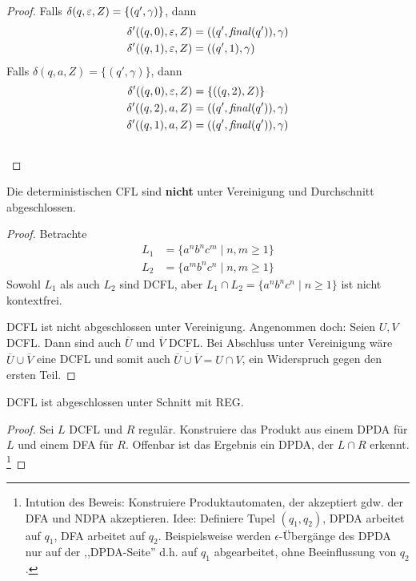 {\begin{proof}
  Falls $\delta(q,\varepsilon,Z) = \{(q',\gamma)\}$, dann
  \begin{align*}
    \delta'((q,0),\varepsilon,Z) &= ((q',\mathit{final} (q')),\gamma)
    \\
    \delta'((q,1),\varepsilon,Z) &= ((q',1),\gamma)
  \end{align*}
  Falls $\delta(q,a,Z) = \{(q',\gamma)\}$, dann
  \begin{align*}
    \delta'((q,0), \Eps, Z) &= \{ ((q,2), Z) \} \\
    \delta'((q,2), a, Z) &=((q',\mathit{final} (q')), \gamma)
    \\
    \delta'((q,1), a, Z) &=
    ((q',\mathit{final} (q')), \gamma)
    \\ \tag*{\qedhere}    %
  \end{align*}
\end{proof}
\begin{Satz}
    Die deterministischen \ac{CFL} sind \textbf{nicht} unter Vereinigung und Durchschnitt abgeschlossen.
\end{Satz}
\begin{proof}
    Betrachte
    \begin{align*}
        L_1 &= \{ a^nb^nc^m \mid n, m \ge 1 \} \\
        L_2 &= \{ a^mb^nc^n \mid n, m \ge 1 \}
    \end{align*}
    Sowohl $L_1$ als auch $L_2$ sind DCFL, aber $L_1 \cap L_2 = \{ a^nb^nc^n \mid n \ge 1\}$ ist nicht kontextfrei.
    
    DCFL ist nicht abgeschlossen unter Vereinigung. Angenommen doch: Seien $U, V$ DCFL. Dann sind auch $\overline{U}$ und $\overline{V}$ DCFL. Bei Abschluss unter Vereinigung wäre $\overline{U} \cup \overline{V}$ eine DCFL und somit auch $\overline{\overline{U} \cup \overline{V}} = U \cap V$, ein Widerspruch gegen den ersten Teil.
\end{proof}
\begin{Satz}
    DCFL ist abgeschlossen unter Schnitt mit REG.
\end{Satz}
\begin{proof}
    Sei $L$ DCFL und $R$ regulär.
    Konstruiere das Produkt aus einem DPDA für $L$ und einem DFA für $R$.
    Offenbar ist das Ergebnis ein DPDA, der $L\cap R$ erkennt. \footnote{
    Intution des Beweis: Konstruiere Produktautomaten, der akzeptiert gdw. der DFA und NDPA akzeptieren. Idee: Definiere Tupel $(q_1, q_2)$, DPDA arbeitet auf $q_1$, DFA arbeitet auf $q_2$. Beispielsweise werden $\epsilon$-Übergänge des DPDA nur auf der ,,DPDA-Seite'' d.h. auf $q_1$ abgearbeitet, ohne Beeinflussung von $q_2$.
    }


\end{proof}}
